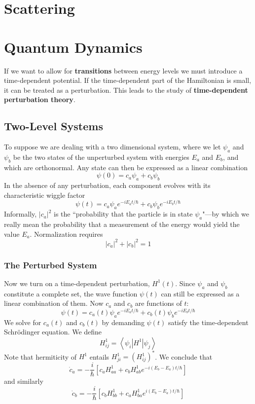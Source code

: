 \documentclass[12pt, a4paper, oneside, openright, titlepage]{book}
\newcommand{\brkt}[1]{\left\langle #1\right\rangle}
\begin{document}
\chapter{Scattering}



\chapter{Quantum Dynamics}


If we want to allow for \textbf{transitions} between energy levels we must introduce a time-dependent potential. If the time-dependent part of the Hamiltonian is small, it can be treated as a perturbation. This leads to the study of \textbf{time-dependent perturbation theory}.

\section{Two-Level Systems}

To suppose we are dealing with a two dimensional system, where we let $\psi_a$ and $\psi_b$ be the two states of the unperturbed system with energies $E_a$ and $E_b$, and which are orthonormal. Any state can then be expressed as a linear combination $$\psi(0) = c_a\psi_a + c_b\psi_b$$
In the absence of any perturbation, each component evolves with its characteristic wiggle factor $$\psi(t) = c_a\psi_ae^{-iE_at/\hbar}+c_b\psi_be^{-iE_bt/\hbar}$$
Informally, $|c_a|^2$ is the ``probability that the particle is in state $\psi_a$"---by which we really mean the probability that a measurement of the energy would yield the value $E_a$. Normalization requires $$|c_a|^2+|c_b|^2 = 1$$

\subsection{The Perturbed System}

Now we turn on a time-dependent perturbation, $H^1(t)$. Since $\psi_a$ and $\psi_b$ constitute a complete set, the wave function $\psi(t)$ can still be expressed as a linear combination of them. Now $c_a$ and $c_b$ are functions of $t$: $$\psi(t) = c_a(t) \psi_ae^{-iE_at/\hbar}+c_b(t)\psi_be^{-iE_bt/\hbar}$$
We solve for $c_a(t)$ and $c_b(t)$ by demanding $\psi(t)$ satisfy the time-dependent Schr\"{o}dinger equation. We define $$H_{ij}^1 = \brkt{\psi_i|H^1|\psi_j}$$
Note that hermiticity of $H^1$ entails $H^1_{ji} = (H^1_{ij})^*$. We conclude that $$\dot{c}_a = -\frac{i}{\hbar}\left[c_aH_{aa}^1+c_bH_{ab}^1e^{-i(E_b-E_a)t/\hbar}\right]$$
and similarly $$\dot{c}_b = -\frac{i}{\hbar}\left[c_bH_{bb}^1+c_aH_{ba}^1e^{i(E_b-E_a)t/\hbar}\right]$$
\end{document}
